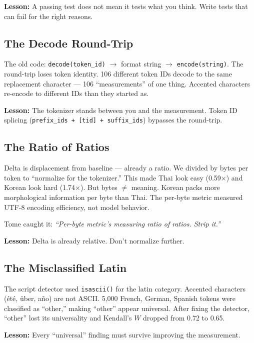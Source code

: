\documentclass[11pt,a4paper]{article}
\newcommand{\cq}[1]{\textcolor{q}{\textit{``#1''}}}
\begin{document}
\textbf{Lesson:} A passing test does not mean it tests what you think. Write tests that can fail for the right reasons.

\subsection{The Decode Round-Trip}

The old code: \texttt{decode(token\_id)} $\to$ format string $\to$ \texttt{encode(string)}. The round-trip loses token identity. 106 different token IDs decode to the same replacement character --- 106 ``measurements'' of one thing. Accented characters re-encode to different IDs than they started as.

\textbf{Lesson:} The tokenizer stands between you and the measurement. Token ID splicing (\texttt{prefix\_ids + [tid] + suffix\_ids}) bypasses the round-trip.

\subsection{The Ratio of Ratios}

Delta is displacement from baseline --- already a ratio. We divided by bytes per token to ``normalize for the tokenizer.'' This made Thai look easy (0.59$\times$) and Korean look hard (1.74$\times$). But bytes $\neq$ meaning. Korean packs more morphological information per byte than Thai. The per-byte metric measured UTF-8 encoding efficiency, not model behavior.

Tome caught it: \cq{Per-byte metric's measuring ratio of ratios. Strip it.}

\textbf{Lesson:} Delta is already relative. Don't normalize further.

\subsection{The Misclassified Latin}

The script detector used \texttt{isascii()} for the latin category. Accented characters (\'et\'e, \"uber, a\~no) are not ASCII. 5{,}000 French, German, Spanish tokens were classified as ``other,'' making ``other'' appear universal. After fixing the detector, ``other'' lost its universality and Kendall's $W$ dropped from 0.72 to 0.65.

\textbf{Lesson:} Every ``universal'' finding must survive improving the measurement.

\end{document}
